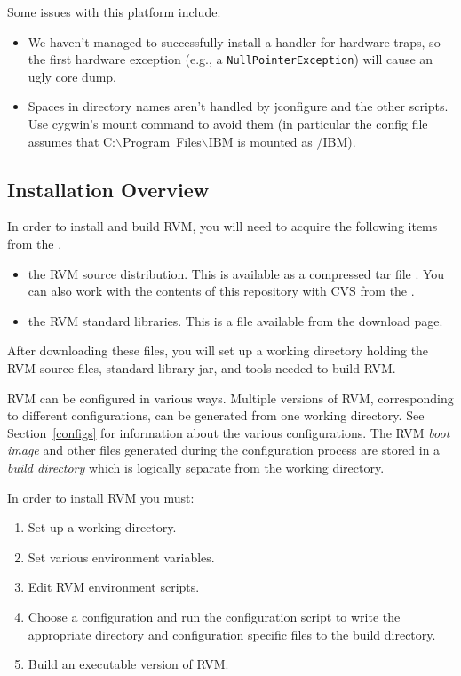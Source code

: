 Some issues with this platform include:

\begin{itemize}
\item We haven't managed to successfully install a handler for hardware traps,
so the first hardware exception (e.g., a {\tt NullPointerException}) will cause
an ugly core dump.
\item Spaces in directory names aren't handled by jconfigure and the
other scripts.  Use cygwin's mount command to avoid them (in
particular the config file assumes that
C:$\backslash$Program~Files$\backslash$IBM is mounted as /IBM).
\end{itemize}

\JikesTMFooter

\JavaTMFooter

\AIXTMFooter

\PowerPCTMFooter

\subsection{Installation Overview}

In order to install and build RVM, you will need to acquire the following
items from the 
.
\begin{itemize}
\item the RVM source distribution.  This is available as a compressed tar
file {\tt \RVMTarFile}.  You can also work with the contents of this repository with CVS from the
.
\item the RVM standard libraries.  This is a file {\tt \LibTarFile}
available from the download page. 
\end{itemize}

After downloading these files, you will set up 
a working directory holding the RVM source files, standard library jar, and 
tools needed to build RVM. 

RVM can be configured in various ways. Multiple versions of RVM,
corresponding to different configurations, can be generated from 
one working directory. See Section~\ref{configs} for information about the 
various 
configurations.
The RVM  {\em boot image} and other files generated during the 
configuration process
are stored in a {\em build directory} which is logically separate from 
the working directory. 

In order to install RVM  you must:
\begin{enumerate}
\item Set up a working directory.
\item Set various environment variables.
\item Edit RVM environment scripts.
\item Choose a configuration and run the configuration script to write
the appropriate directory and configuration specific files to the
build directory.
\item Build an executable version of RVM.
\end{enumerate}

